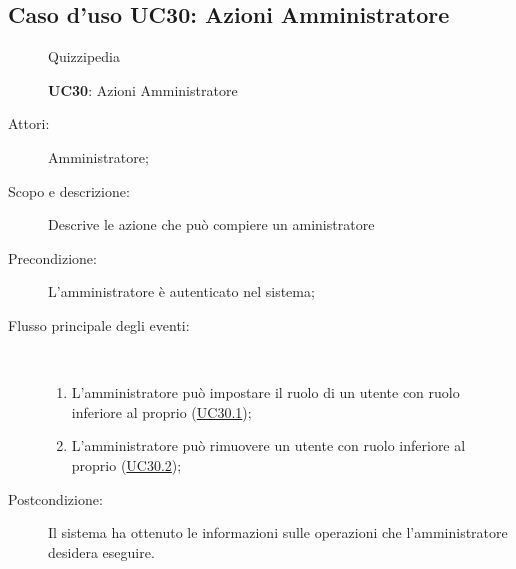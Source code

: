 \subsection{Caso d'uso UC30: Azioni Amministratore}
	\begin{figure}[H]
		\centering
		\begin{resizedtikzpicture}{\textwidth}
		\begin{umlsystem}[x=0, fill=lightgray!20]{Quizzipedia}
		\end{umlsystem}
		\end{resizedtikzpicture}
		\caption{\textbf{UC30}: Azioni Amministratore}
		\label{UC30}
	\end{figure}
\begin{description}
\item[Attori:] Amministratore;
\item[Scopo e descrizione:] Descrive le azione che può compiere un aministratore
      \item[Precondizione:] L'amministratore è autenticato nel sistema;

        \item[Flusso principale degli eventi:] \ 
 \begin{enumerate}
          \item L'amministratore può impostare il ruolo di un utente con ruolo inferiore al proprio (\hyperlink{UC30.1}{UC30.1});
          \item L'amministratore può rimuovere un utente con ruolo inferiore al proprio (\hyperlink{UC30.2}{UC30.2});

      \end{enumerate}
    \item[Postcondizione:] Il sistema ha ottenuto le informazioni sulle operazioni che l’amministratore desidera eseguire.
  \end{description}
\hypertarget{UC30.1}{}
